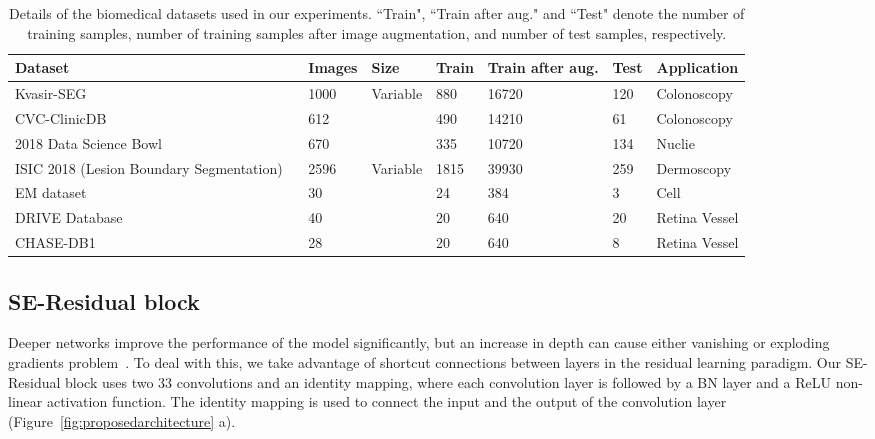 \documentclass[journal]{IEEEtran}
\begin{document}
\begin{table*} [t!]
\footnotesize
 \caption{Details of the biomedical datasets used in our experiments. ``Train", ``Train after aug." and ``Test" denote the number of training samples, number of training samples after image augmentation, and number of test samples, respectively.}
    \label{table:datasettable}
    \centering
          \begin{tabular}{@{}l|l|l|l|l|l|l@{}} 
            \toprule
        \textbf{Dataset} &\textbf{Images} &\textbf{Size}  &\textbf{Train} &\textbf{Train after aug.} & \textbf{Test} &\textbf{Application}\\ 
\midrule
Kvasir-SEG~\cite{jha2020kvasir} & 1000 & Variable & 880 & 16720 & 120 &Colonoscopy\\  CVC-ClinicDB~\cite{bernal2015wm} & 612 &  & 490 & 14210 & 61 &Colonoscopy\\  2018 Data Science Bowl~\cite{caicedo2019nucleus} & 670 &  & 335 & 10720 & 134 & Nuclie \\  ISIC 2018 (Lesion Boundary Segmentation)  ~\cite{codella2018skin,tschandl2018ham10000}& 2596 & Variable & 1815 & 39930 & 259 & Dermoscopy\\ EM dataset~\cite{cardona2010integrated} & 30 &  & 24 & 384 & 3 & Cell \\DRIVE Database~\cite{staal2004ridge} & 40 &  & 20 & 640 & 20 & Retina Vessel\\CHASE-DB1~\cite{owen2009measuring} & 28 &  & 20 & 640 & 8 & Retina Vessel\\\bottomrule
\end{tabular}
\end{table*}	

\subsection{SE-Residual block}
Deeper networks improve the performance of the model significantly, but an increase in depth can cause either vanishing or exploding gradients problem~\cite{he2016deep}. To deal with this, we take advantage of shortcut connections between layers in the residual learning paradigm. Our SE-Residual block uses two 33 convolutions and an identity mapping, where each convolution layer is followed by a \ac{BN} layer and a \ac{ReLU} non-linear activation function. The identity mapping is used to connect the input and the output of the convolution layer (Figure~\ref{fig:proposedarchitecture} a). 
\end{document}
